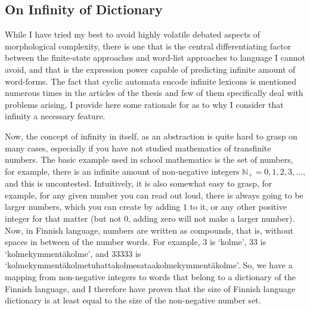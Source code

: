 \documentclass[officiallayout,final]{unihelcompling}
\begin{document}
\subsection{On Infinity of Dictionary}
\label{subsec:infinity}

While I have tried my best to avoid highly volatile debated aspects of
\gls{morphological complexity}, there is one that is the central
differentiating factor between the finite-state approaches and word-list
approaches to language I cannot avoid, and that is the expression power capable
of predicting infinite amount of word-forms. The fact that cyclic automata
encode infinite lexicons is mentioned numerous times in the articles of the
thesis and few of them specifically deal with problems arising, I provide here
some rationale for as to why I consider that infinity a necessary feature.

Now, the concept of infinity in itself, as an abstraction is quite hard to
grasp on many cases, especially if you have not studied mathematics of
transfinite numbers. The basic example used in school mathematics is the set of
numbers, for example, there is an infinite amount of non-negative integers
$\mathbb{N}_+ = 0, 1, 2, 3, \ldots$, and this is uncontested. Intuitively, it
is also somewhat easy to grasp, for example, for any given number you can read
out loud, there is always going to be larger numbers, which you can create by
adding $1$ to it, or any other positive integer for that matter (but not $0$,
adding zero will not make a larger number). Now, in Finnish language, numbers
are written as compounds, that is, without spaces in between of the number
words.  For example, 3 is `kolme', 33 is `kolmekymmentäkolme', and 33333 is
`kolmekymmentäkolmetuhattakolmesataakolmekymmentäkolme'. So, we have a mapping
from non-negative integers to words that belong to a dictionary of the Finnish
language, and I therefore have proven that the size of Finnish language
dictionary is at least equal to the size of the non-negative number
set.
\end{document}
